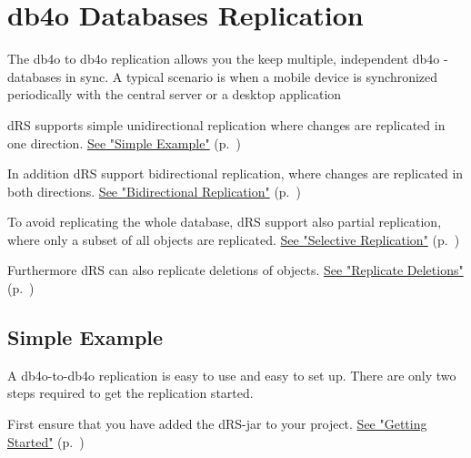 
\chapter{db4o Databases Replication}
\label{drs:db4o-replication-system-drs-db4o-databases-replication}

The db4o to db4o replication allows you the keep multiple, independent db4o -databases in sync. A typical scenario is when a mobile device is synchronized periodically with the central server or a desktop application

dRS supports simple unidirectional replication where changes are replicated in one direction. \hyperref[drs:db4o-replication-system-drs-db4o-databases-replication-simple-example]{See "Simple Example"} (p.~\pageref{drs:db4o-replication-system-drs-db4o-databases-replication-simple-example})

In addition dRS support bidirectional replication, where changes are replicated in both directions. \hyperref[drs:db4o-replication-system-drs-db4o-databases-replication-bi-directional-replication]{See "Bidirectional Replication"} (p.~\pageref{drs:db4o-replication-system-drs-db4o-databases-replication-bi-directional-replication})

To avoid replicating the whole database, dRS support also partial replication, where only a subset of all objects are replicated. \hyperref[drs:db4o-replication-system-drs-db4o-databases-replication-selective-replication]{See "Selective Replication"} (p.~\pageref{drs:db4o-replication-system-drs-db4o-databases-replication-selective-replication})

Furthermore dRS can also replicate deletions of objects. \hyperref[drs:db4o-replication-system-drs-db4o-databases-replication-deleted-objects-replication]{See "Replicate Deletions"} (p.~\pageref{drs:db4o-replication-system-drs-db4o-databases-replication-deleted-objects-replication})

\section{Simple Example}
\label{drs:db4o-replication-system-drs-db4o-databases-replication-simple-example}

A db4o-to-db4o replication is easy to use and easy to set up. There are only two steps required to get the replication started.

First ensure that you have added the dRS-jar to your project. \hyperref[drs:db4o-replication-system-drs-getting-started]{See "Getting Started"} (p.~\pageref{drs:db4o-replication-system-drs-getting-started})

